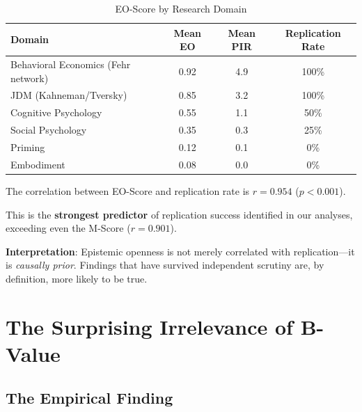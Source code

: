 \documentclass[11pt,a4paper]{article}
\begin{document}
\begin{table}[h]
\centering
\caption{EO-Score by Research Domain}
\label{tab:domains}
\begin{tabular}{lccc}
\toprule
\textbf{Domain} & \textbf{Mean EO} & \textbf{Mean PIR} & \textbf{Replication Rate} \\
\midrule
Behavioral Economics (Fehr network) & 0.92 & 4.9 & 100\% \\
JDM (Kahneman/Tversky) & 0.85 & 3.2 & 100\% \\
Cognitive Psychology & 0.55 & 1.1 & 50\% \\
Social Psychology & 0.35 & 0.3 & 25\% \\
Priming & 0.12 & 0.1 & 0\% \\
Embodiment & 0.08 & 0.0 & 0\% \\
\bottomrule
\end{tabular}
\end{table}

\begin{resultbox}[title={The EO-Replication Relationship}]
The correlation between EO-Score and replication rate is $r = 0.954$ ($p < 0.001$).

This is the \textbf{strongest predictor} of replication success identified in our analyses, exceeding even the M-Score ($r = 0.901$).

\textbf{Interpretation}: Epistemic openness is not merely correlated with replication---it is \textit{causally prior}. Findings that have survived independent scrutiny are, by definition, more likely to be true.
\end{resultbox}


\section{The Surprising Irrelevance of B-Value}
\label{sec:bvalue}

\subsection{The Empirical Finding}
\end{document}
